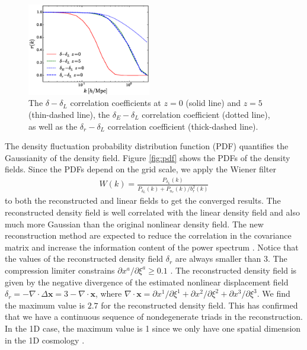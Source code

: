 \documentclass[aps,prd,twocolumn,superscriptaddress,groupedaddress,nofootinbib]{revtex4}  %
\newcommand{\bea}{\begin{eqnarray}}
\newcommand{\eea}{\end{eqnarray}}
\begin{document}
\begin{figure}[tbp]
\begin{center}
\includegraphics[width=0.48\textwidth]{fa.eps}
\end{center}
\vspace{-0.7cm}
\caption{
The $\delta-\delta_L$ correlation coefficients at $z=0$ (solid
line) and $z=5$ (thin-dashed line), the $\delta_E-\delta_L$ correlation
coefficient (dotted line), as well as the $\delta_r-\delta_L$
correlation coefficient (thick-dashed line).}
    
\label{fig:xcc}
\end{figure}

The density fluctuation probability distribution function (PDF) quantifies 
the Gaussianity of the density field. 
Figure \ref{fig:pdf} shows the PDFs of the density fields. 
Since the PDFs depend on the grid scale, we apply the Wiener filter
\bea
W(k)=\frac{P_{\delta_L}(k)}{P_{\delta_L}(k)+P_{n_r}(k)/b_r^2(k)}
\eea
to both the reconstructed and linear fields to get the converged results.
The reconstructed density field is well correlated with the linear density 
field and also much more Gaussian than the original nonlinear density field.
The new reconstruction method are expected to reduce the correlation in the 
covariance matrix and increase the information content of the power spectrum
\cite{1999MNRAS.308.1179M,1999ApJ...527....1S,2005MNRAS.360L..82R}.
Notice that the values of the reconstructed density field $\delta_r$ are always
smaller than 3. 
The compression limiter constrains $\partial x^a/\partial\xi^a\geq0.1$ 
\cite{1995ApJS..100..269P,1998ApJS..115...19P}.
The reconstructed density field is given by the negative
divergence of the estimated nonlinear displacement field
$\delta_r=-\nabla\cdot\Delta{\bm{x}}=3-\nabla\cdot\bm{x}$,
where $\nabla\cdot\bm{x}=\partial x^1/\partial\xi^1+\partial x^2/\partial\xi^2
+\partial x^3/\partial\xi^3$. 
We find the maximum value is $2.7$ for the reconstructed density field.  
This has confirmed that we have a continuous sequence of 
nondegenerate triads in the reconstruction. 
In the 1D case, the maximum value is 1 since we only have one spatial dimension
in the 1D cosmology \cite{2016arXiv160907041Z}.
\end{document}
